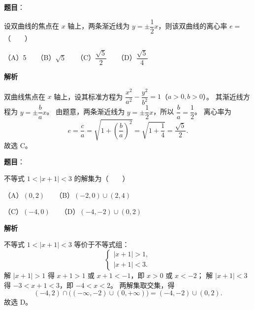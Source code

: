 \begin{answer}

\textbf{题目}：

设双曲线的焦点在 $x$ 轴上，两条渐近线为 $y=\pm\dfrac{1}{2}x$，则该双曲线的离心率 $e=$\mbox{（　　）}

（A）5　　（B）$\sqrt{5}$　　（C）$\dfrac{\sqrt{5}}{2}$　　（D）$\dfrac{\sqrt{5}}{4}$

\textbf{解析}

双曲线焦点在 $x$ 轴上，设其标准方程为 $\dfrac{x^2}{a^2}-\dfrac{y^2}{b^2}=1$（$a>0,b>0$）。
其渐近线方程为 $y=\pm\dfrac{b}{a}x$。
由题意，两条渐近线为 $y=\pm\dfrac{1}{2}x$，所以 $\dfrac{b}{a}=\dfrac{1}{2}$。
离心率为
\nopagebreak[4]
\[
e=\frac{c}{a}=\sqrt{1+\left(\frac{b}{a}\right)^2}=\sqrt{1+\frac{1}{4}}=\frac{\sqrt{5}}{2}.
\]
故选 C。


\end{answer}
\begin{answer}

\textbf{题目}：

不等式 $1<|x+1|<3$ 的解集为\mbox{（　　）}

（A）$(0,2)$　　（B）$(-2,0)\cup(2,4)$

（C）$(-4,0)$　　（D）$(-4,-2)\cup(0,2)$

\textbf{解析}

不等式 $1<|x+1|<3$ 等价于不等式组：
\nopagebreak[4]
\[
\begin{cases}
|x+1|>1,\\
|x+1|<3.
\end{cases}
\]
解 $|x+1|>1$ 得 $x+1>1$ 或 $x+1<-1$，即 $x>0$ 或 $x<-2$；
解 $|x+1|<3$ 得 $-3<x+1<3$，即 $-4<x<2$。
两解集取交集，得
\nopagebreak[4]
\[
(-4,2)\cap\bigl((-\infty,-2)\cup(0,+\infty)\bigr)=(-4,-2)\cup(0,2).
\]
故选 D。


\end{answer}
